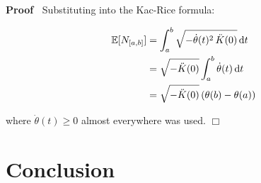 \documentclass{article}
\newenvironment{proof}{\noindent\textbf{Proof\ }}{\hspace*{\fill}$\Box$\medskip}
\begin{document}
\begin{proof}
  Substituting into the Kac-Rice formula:
  
  \begin{align}
    \mathbb{E} [N_{[a, b]}] & = \int_a^b \sqrt{- \dot{\theta} (t)^2 
    \hspace{0.17em} \ddot{K} (0)} \hspace{0.17em} \mathrm{d} t \\
    & = \sqrt{- \ddot{K} (0)}  \int_a^b \dot{\theta} (t) \hspace{0.17em}
    \mathrm{d} t \\
    & = \sqrt{- \ddot{K} (0)}  \hspace{0.17em} (\theta (b) - \theta (a)) 
  \end{align}
  
  where $\dot{\theta} (t) \ge 0$ almost everywhere was used.
\end{proof}

\section{Conclusion}\label{sec:conclusion}
\end{document}
